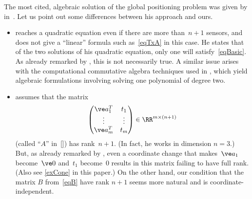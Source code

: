 \documentclass[reqno]{amsart}
\begin{document}
\begin{rem} \label{rBancroft}%
  The most cited,
  algebraic solution of the global positioning problem was given by
   in~\citeyear{Bancroft:1985}. Let us point out
  some differences between his approach and ours.
  \begin{itemize}
  \item {} reaches a quadratic equation even if
    there are more than~$n + 1$ sensors, and does not give a
    ``linear'' formula such as~\eqref{eqTxA} in this case. He states
    that of the two solutions of his quadratic equation, only one will
    satisfy~\eqref{eqBasic}. As already remarked by
    , this is not necessarily true.
A similar issue arises with the computational commutative algebra techniques used in , which  yield algebraic formulations 
involving solving one polynomial of degree two.

    
  \item {} assumes that the matrix
    \begin{equation} \label{eqBancroft}%
      \begin{pmatrix}
        \ve a_1^T & t_1 \\
        \vdots & \vdots \\
        \ve a_m^T & t_m
      \end{pmatrix} \in \RR^{m \times (n + 1)}
    \end{equation}
    (called ``$A$'' in~[]) has
    rank~$n+1$. (In fact, he works in dimension $n = 3$.) But, as
    already remarked by , even a coordinate
    change that makes~$\ve a_1$ become~$\ve 0$ and~$t_1$ become~$0$
    results in this matrix failing to have full rank. (Also see
    \cref{exCone} in this paper.) On the other hand, our condition
    that the matrix $B$ from~\eqref{eqB} have rank $n + 1$ seems more
    natural and is coordinate-independent. 
  \remend
  \end{itemize}
  \renewcommand{\remend}{}
\end{rem}
\end{document}
